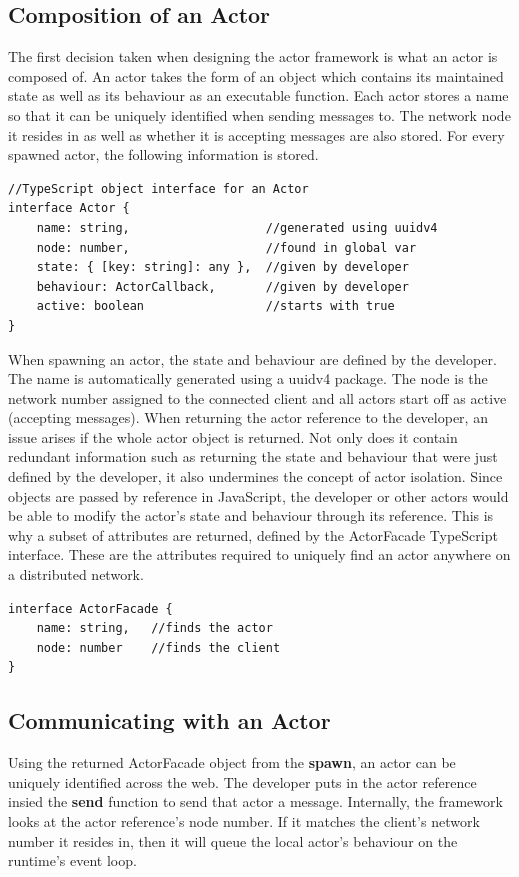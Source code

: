 \documentclass[12pt, a4paper]{report}
\theoremstyle{definition}
\theoremstyle{definition}%
\theoremstyle{definition}%
\theoremstyle{definition}%
\theoremstyle{definition}%
\theoremstyle{definition}%
\begin{document}
\subsection{Composition of an Actor}
The first decision taken when designing the actor framework is what an actor is composed of. An actor takes the form of an object which contains its maintained state as well as its behaviour as an executable function. Each actor stores a name so that it can be uniquely identified when sending messages to. The network node it resides in as well as whether it is accepting messages are also stored. For every spawned actor, the following information is stored.
\begin{lstlisting}
//TypeScript object interface for an Actor
interface Actor {
    name: string,                   //generated using uuidv4
    node: number,                   //found in global var
    state: { [key: string]: any },  //given by developer
    behaviour: ActorCallback,       //given by developer
    active: boolean                 //starts with true
}
\end{lstlisting}
When spawning an actor, the state and behaviour are defined by the developer. The name is automatically generated using a uuidv4 package. The node is the network number assigned to the connected client and all actors start off as active (accepting messages). When returning the actor reference to the developer, an issue arises if the whole actor object is returned. Not only does it contain redundant information such as returning the state and behaviour that were just defined by the developer, it also undermines the concept of actor isolation. Since objects are passed by reference in JavaScript, the developer or other actors would be able to modify the actor's state and behaviour through its reference. This is why a subset of attributes are returned, defined by the ActorFacade TypeScript interface. These are the attributes required to uniquely find an actor anywhere on a distributed network.
\begin{lstlisting}
interface ActorFacade {
    name: string,   //finds the actor
    node: number    //finds the client
}
\end{lstlisting}
\subsection{Communicating with an Actor}
Using the returned ActorFacade object from the \textbf{spawn}, an actor can be uniquely identified across the web. The developer puts in the actor reference insied the \textbf{send} function to send that actor a message. Internally, the framework looks at the actor reference's node number. If it matches the client's network number it resides in, then it will queue the local actor's behaviour on the runtime's event loop. 
\end{document}
